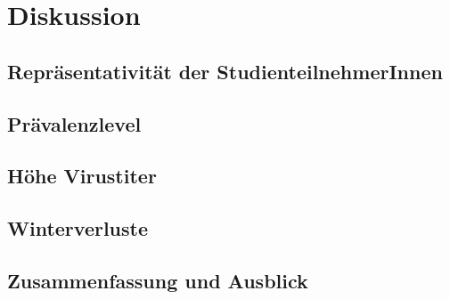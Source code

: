 \section{Diskussion}

\subsection{Repräsentativität der StudienteilnehmerInnen}

\blindtext

\subsection{Prävalenzlevel}

\blindtext

\subsection{Höhe Virustiter}

\blindtext

\subsection{Winterverluste}

\blindtext

\subsection{Zusammenfassung und Ausblick}

\blindtext